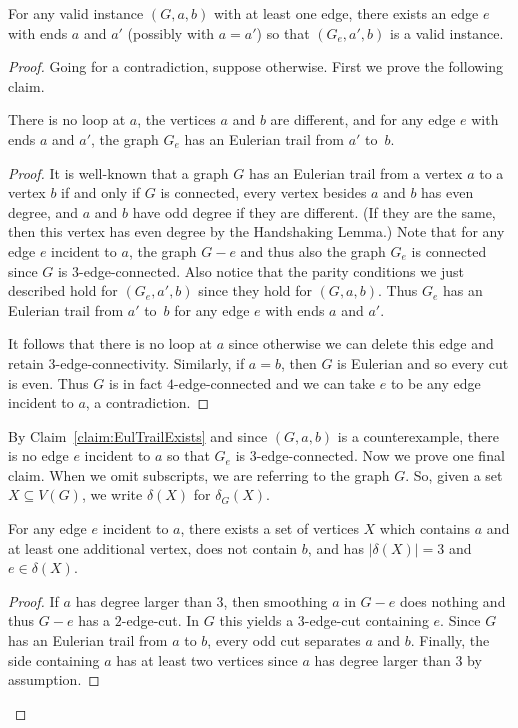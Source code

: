 \documentclass[a4paper, 12pt]{article}
\begin{document}
\begin{lemma}
\label{lem:splittingMinCut}
For any valid instance $(G, a, b)$ with at least one edge, there exists an edge $e$ with ends $a$ and $a'$ (possibly with $a=a'$) so that $(G_e, a', b)$ is a valid instance.
\end{lemma}
\begin{proof}
Going for a contradiction, suppose otherwise. First we prove the following claim.

\begin{claim}
\label{claim:EulTrailExists}
There is no loop at $a$, the vertices $a$ and $b$ are different, and for any edge $e$ with ends $a$ and $a'$, the graph $G_e$ has an Eulerian trail from $a'$ to~$b$.
\end{claim}
\begin{proof}
    It is well-known that a graph $G$ has an Eulerian trail from a vertex $a$ to a vertex $b$ if and only if $G$ is connected, every vertex besides $a$ and $b$ has even degree, and $a$ and $b$ have odd degree if they are different. (If they are the same, then this vertex has even degree by the Handshaking Lemma.) Note that for any edge $e$ incident to $a$, the graph $G-e$ and thus also the graph $G_e$ is connected since $G$ is $3$-edge-connected. Also notice that the parity conditions we just described hold for $(G_e, a', b)$ since they hold for $(G, a, b)$. Thus $G_e$ has an Eulerian trail from $a'$ to~$b$ for any edge $e$ with ends $a$ and $a'$.

    It follows that there is no loop at $a$ since otherwise we can delete this edge and retain $3$-edge-connectivity. Similarly, if $a=b$, then $G$ is Eulerian and so every cut is even. Thus $G$ is in fact $4$-edge-connected and we can take $e$ to be any edge incident to $a$, a contradiction.
\end{proof}

By Claim~\ref{claim:EulTrailExists} and since $(G,a,b)$ is a counterexample, there is no edge $e$ incident to $a$ so that $G_e$ is $3$-edge-connected. Now we prove one final claim. When we omit subscripts, we are referring to the graph $G$. So, given a set $X \subseteq V(G)$, we write $\delta(X)$ for $\delta_G(X)$.

\begin{claim}
\label{claim:edgeCuts}
For any edge $e$ incident to $a$, there exists a set of vertices $X$ which contains $a$ and at least one additional vertex, does not contain $b$, and has $|\delta(X)|=3$ and $e \in \delta(X)$.
\end{claim}
\begin{proof}
If $a$ has degree larger than $3$, then smoothing $a$ in $G-e$ does nothing and thus $G-e$ has a $2$-edge-cut. In $G$ this yields a $3$-edge-cut containing $e$. Since $G$ has an Eulerian trail from $a$ to $b$, every odd cut separates $a$ and $b$. Finally, the side containing $a$ has at least two vertices since $a$ has degree larger than $3$ by assumption.


\end{proof}
\end{proof}
\end{document}
